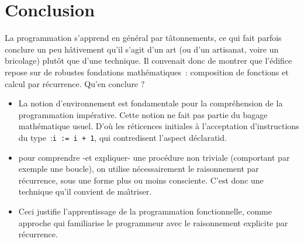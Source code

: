 

\chapter*{Conclusion}

La programmation s'apprend en général par t\^atonnements, ce qui fait
parfois conclure un peu h\^ativement qu'il s'agit d'un art (ou d'un
artisanat, voire un bricolage) plut\^ot que d'une technique. Il
convenait donc de montrer que l'édifice repose sur de robustes
fondations mathématiques~: composition de fonctions et calcul par
récurrence. Qu'en conclure ?

\begin{itemize}
\item La notion d'environnement est fondamentale pour la compréhension
  de la programmation impérative. Cette notion ne fait pas partie du
  bagage mathématique usuel. D'o\`u les réticences initiales à
  l'acceptation d'instructions du type~:\verb/i := i + 1/, qui contredisent
  l'aspect déclaratid.
 
\item pour comprendre  -et expliquer- une procédure
non triviale (comportant par exemple une boucle), on  utilise
nécessairement le raisonnement par récurrence, sous une forme plus ou
moins consciente. C'est donc une technique qu'il convient de
ma\^{\i}triser.

\item Ceci justifie l'apprentissage de la programmation fonctionnelle,
comme approche qui familiarise le programmeur avec
le raisonnement explicite par récurrence.  

\end{itemize}
